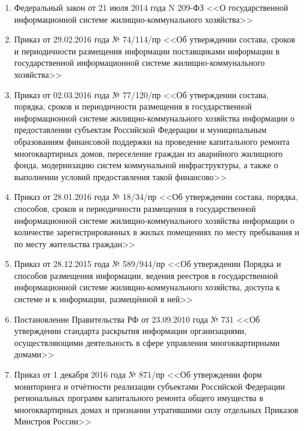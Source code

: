 \begin{enumerate}
	\item Федеральный закон от 21 июля 2014 года N 209-ФЗ <<О государственной информационной системе жилищно-коммунального хозяйства>>
	\item Приказ от 29.02.2016 года № 74/114/пр <<Об утверждении состава, сроков и периодичности размещения информации поставщиками информации в государственной информационной системе жилищно-коммунального хозяйства>>
	\item Приказ от 02.03.2016 года № 77/120/пр <<Об утверждении состава, порядка, сроков и периодичности размещения в государственной информационной системе жилищно-коммунального хозяйства информации о предоставлении субъектам Российской Федерации и муниципальным образованиям финансовой поддержки на проведение капитального ремонта многоквартирных домов, переселение граждан из аварийного жилищного фонда, модернизацию систем коммунальной инфраструктуры, а также о выполнении условий предоставления такой финансово>>
	\item Приказ от 28.01.2016 года № 18/34/пр <<Об утверждении состава, порядка, способов, сроков и периодичности размещения в государственной информационной системе жилищно-коммунального хозяйства информации о количестве зарегистрированных в жилых помещениях по месту пребывания и по месту жительства граждан>>
	\item Приказ от 28.12.2015 года № 589/944/пр <<Об утверждении Порядка и способов размещения информации, ведения реестров в государственной информационной системе жилищно-коммунального хозяйства, доступа к системе и к информации, размещённой в ней>>
	\item Постановление Правительства РФ от 23.09.2010 года № 731 <<Об утверждении стандарта раскрытия информации организациями, осуществляющими деятельность в сфере управления многоквартирными домами>>
	\item Приказ от 1 декабря 2016 года № 871/пр <<Об утверждении форм мониторинга и отчётности реализации субъектами Российской Федерации региональных программ капитального ремонта общего имущества в многоквартирных домах и признании утратившими силу отдельных Приказов Минстроя России>>
\end{enumerate}

\clearpage
\newpage